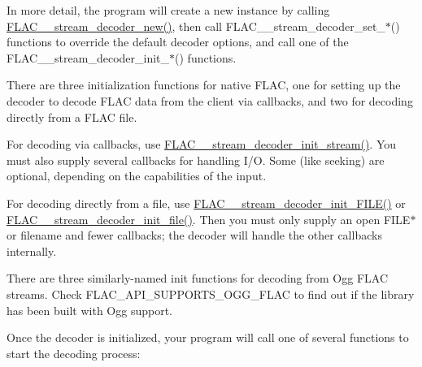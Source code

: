 In more detail, the program will create a new instance by calling \mbox{\hyperlink{group__flac__stream__decoder_ga7159eefc074dfbab4a37462f69326091}{F\+L\+A\+C\+\_\+\+\_\+stream\+\_\+decoder\+\_\+new()}}, then call F\+L\+A\+C\+\_\+\+\_\+stream\+\_\+decoder\+\_\+set\+\_\+$\ast$() functions to override the default decoder options, and call one of the F\+L\+A\+C\+\_\+\+\_\+stream\+\_\+decoder\+\_\+init\+\_\+$\ast$() functions.

There are three initialization functions for native F\+L\+AC, one for setting up the decoder to decode F\+L\+AC data from the client via callbacks, and two for decoding directly from a F\+L\+AC file.

For decoding via callbacks, use \mbox{\hyperlink{group__flac__stream__decoder_ga32c28a56a2bdfa2333edbd3d991894d7}{F\+L\+A\+C\+\_\+\+\_\+stream\+\_\+decoder\+\_\+init\+\_\+stream()}}. You must also supply several callbacks for handling I/O. Some (like seeking) are optional, depending on the capabilities of the input.

For decoding directly from a file, use \mbox{\hyperlink{group__flac__stream__decoder_ga38f9eb46bf112af205f86b4cbac9980c}{F\+L\+A\+C\+\_\+\+\_\+stream\+\_\+decoder\+\_\+init\+\_\+\+F\+I\+L\+E()}} or \mbox{\hyperlink{group__flac__stream__decoder_ga1692108a97012d1c5f79baf7df012c33}{F\+L\+A\+C\+\_\+\+\_\+stream\+\_\+decoder\+\_\+init\+\_\+file()}}. Then you must only supply an open {\ttfamily F\+I\+L\+E$\ast$} or filename and fewer callbacks; the decoder will handle the other callbacks internally.

There are three similarly-\/named init functions for decoding from Ogg F\+L\+AC streams. Check {\ttfamily F\+L\+A\+C\+\_\+\+A\+P\+I\+\_\+\+S\+U\+P\+P\+O\+R\+T\+S\+\_\+\+O\+G\+G\+\_\+\+F\+L\+AC} to find out if the library has been built with Ogg support.

Once the decoder is initialized, your program will call one of several functions to start the decoding process\+:


